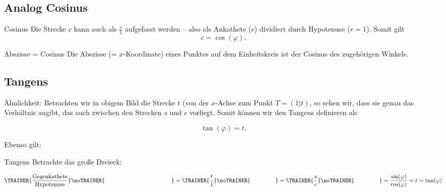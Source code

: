 \subsection{Analog Cosinus}




\begin{bemerkung}{Cosinus}{}
  Die Strecke $c$ kann auch als $\frac{c}1$ aufgefasst werden -- also
  als Ankathete ($c$) dividiert durch Hypotenuse ($r=1$). Somit
  gilt
  $$c = \cos(\varphi).$$
\end{bemerkung}

\begin{bemerkung}{Abszisse = Cosinus}{}
  Die Abszisse (= $x$-Koordinate) eines Punktes auf dem Einheitskreis ist
  der Cosinus des zugehörigen Winkels.
\end{bemerkung}

\newpage
\subsection{Tangens}




Ähnlichkeit: 
Betrachten wir in obigem Bild die Strecke $t$ (von der $x$-Achse zum
Punkt $T=(1|t)$, so sehen wir, dass sie genau das Verhältnis angibt, das
auch zwischen den Strecken $s$ und $c$ vorliegt. 
Somit können wir den Tangens definieren als

$$\tan(\varphi) = t.$$

Ebenso gilt:
\begin{gesetz}{Tangens}{} Betrachte das große Dreieck:
  
  $$\TRAINER{\frac{\text{Gegenkathete}}{\text{Hypotenuse}}}\noTRAINER{\hspace{40mm}}
  =  \TRAINER{\frac{t}1}\noTRAINER{\hspace{15mm}} =
  \TRAINER{\frac{s}{c}}\noTRAINER{\hspace{15mm}} =
\frac{\sin(\varphi)}{\cos(\varphi)} = t =  
  \tan(\varphi) $$
\end{gesetz}
\newpage

